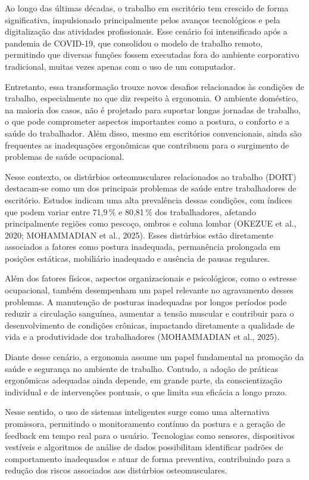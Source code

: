 \documentclass[12pt,a4paper]{article}
\begin{document}
Ao longo das últimas décadas, o trabalho em escritório tem crescido de forma
significativa, impulsionado principalmente pelos avanços tecnológicos e pela
digitalização das atividades profissionais. Esse cenário foi intensificado após a
pandemia de COVID-19, que consolidou o modelo de trabalho remoto, permitindo que
diversas funções fossem executadas fora do ambiente corporativo tradicional,
muitas vezes apenas com o uso de um computador.

Entretanto, essa transformação trouxe novos desafios relacionados às condições de
trabalho, especialmente no que diz respeito à ergonomia. O ambiente doméstico, na
maioria dos casos, não é projetado para suportar longas jornadas de trabalho, o que
pode comprometer aspectos importantes como a postura, o conforto e a saúde do
trabalhador. Além disso, mesmo em escritórios convencionais, ainda são frequentes
as inadequações ergonômicas que contribuem para o surgimento de problemas de saúde
ocupacional.

Nesse contexto, os distúrbios osteomusculares relacionados ao trabalho (DORT)
destacam-se como um dos principais problemas de saúde entre trabalhadores de
escritório. Estudos indicam uma alta prevalência dessas condições, com índices que
podem variar entre 71,9\,\% e 80,81\,\% dos trabalhadores, afetando principalmente
regiões como pescoço, ombros e coluna lombar (OKEZUE et al., 2020; MOHAMMADIAN et
al., 2025). Esses distúrbios estão diretamente associados a fatores como postura
inadequada, permanência prolongada em posições estáticas, mobiliário inadequado e
ausência de pausas regulares.

Além dos fatores físicos, aspectos organizacionais e psicológicos, como o estresse
ocupacional, também desempenham um papel relevante no agravamento desses problemas.
A manutenção de posturas inadequadas por longos períodos pode reduzir a circulação
sanguínea, aumentar a tensão muscular e contribuir para o desenvolvimento de
condições crônicas, impactando diretamente a qualidade de vida e a produtividade
dos trabalhadores (MOHAMMADIAN et al., 2025).

Diante desse cenário, a ergonomia assume um papel fundamental na promoção da saúde
e segurança no ambiente de trabalho. Contudo, a adoção de práticas ergonômicas
adequadas ainda depende, em grande parte, da conscientização individual e de
intervenções pontuais, o que limita sua eficácia a longo prazo.

Nesse sentido, o uso de sistemas inteligentes surge como uma alternativa
promissora, permitindo o monitoramento contínuo da postura e a geração de feedback
em tempo real para o usuário. Tecnologias como sensores, dispositivos vestíveis e
algoritmos de análise de dados possibilitam identificar padrões de comportamento
inadequados e atuar de forma preventiva, contribuindo para a redução dos riscos
associados aos distúrbios osteomusculares.
\end{document}
